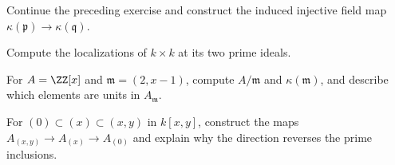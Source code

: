 \begin{exercise}
Continue the preceding exercise and construct the induced injective field map $\kappa(\mathfrak p)\to\kappa(\mathfrak q)$.
\end{exercise}

\begin{exercise}
Compute the localizations of $k\times k$ at its two prime ideals.
\end{exercise}

\begin{exercise}
For $A=\ZZ[x]$ and $\mathfrak m=(2,x-1)$, compute $A/\mathfrak m$ and $\kappa(\mathfrak m)$, and describe which elements are units in $A_{\mathfrak m}$.
\end{exercise}

\begin{exercise}
For $(0)\subset(x)\subset(x,y)$ in $k[x,y]$, construct the maps $A_{(x,y)}\to A_{(x)}\to A_{(0)}$ and explain why the direction reverses the prime inclusions.
\end{exercise}
